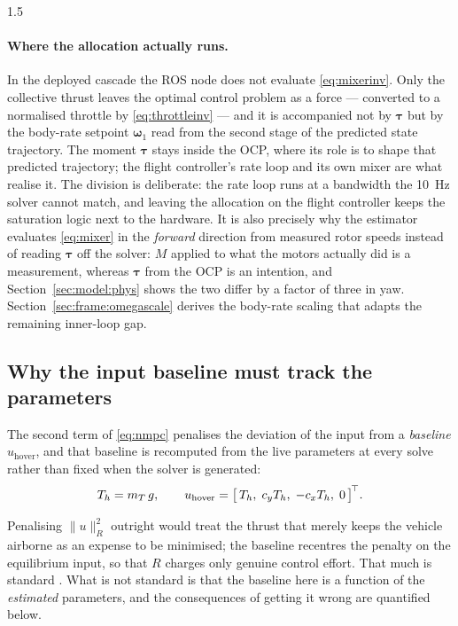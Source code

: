 \begin{spacing}{1.5}
\paragraph{Where the allocation actually runs.} In the deployed cascade the ROS
node does not evaluate \eqref{eq:mixerinv}. Only the collective thrust leaves the
optimal control problem as a force --- converted to a normalised throttle by
\eqref{eq:throttleinv} --- and it is accompanied not by $\bm\tau$ but by the
body-rate setpoint $\bm\omega_1$ read from the second stage of the predicted
state trajectory. The moment $\bm\tau$ stays inside the OCP, where its role is to
shape that predicted trajectory; the flight controller's rate loop and its own
mixer are what realise it. The division is deliberate: the rate loop runs at a
bandwidth the \SI{10}{\hertz} solver cannot match, and leaving the allocation on
the flight controller keeps the saturation logic next to the hardware. It is also
precisely why the estimator evaluates \eqref{eq:mixer} in the \emph{forward}
direction from measured rotor speeds instead of reading $\bm\tau$ off the solver:
$M$ applied to what the motors actually did is a measurement, whereas $\bm\tau$
from the OCP is an intention, and Section~\ref{sec:model:phys} shows the two
differ by a factor of three in yaw. Section~\ref{sec:frame:omegascale} derives
the body-rate scaling that adapts the remaining inner-loop gap.

\subsection{Why the input baseline must track the parameters}\label{sec:model:hover}

The second term of \eqref{eq:nmpc} penalises the deviation of the input from a
\emph{baseline} $u_{\mathrm{hover}}$, and that baseline is recomputed from the
live parameters at every solve rather than fixed when the solver is generated:
\begin{equation}
T_h = m_T\, g,
\qquad
u_{\mathrm{hover}} = \bigl[\, T_h,\; c_y T_h,\; -c_x T_h,\; 0 \,\bigr]^{\!\top}.
\label{eq:hover}
\end{equation}

Penalising $\|u\|^2_R$ outright would treat the thrust that merely keeps the
vehicle airborne as an expense to be minimised; the baseline recentres the
penalty on the equilibrium input, so that $R$ charges only genuine control
effort. That much is standard \cite{rawlings2017mpc}. What is not standard is
that the baseline here is a function of the \emph{estimated} parameters, and the
consequences of getting it wrong are quantified below.


\end{spacing}
